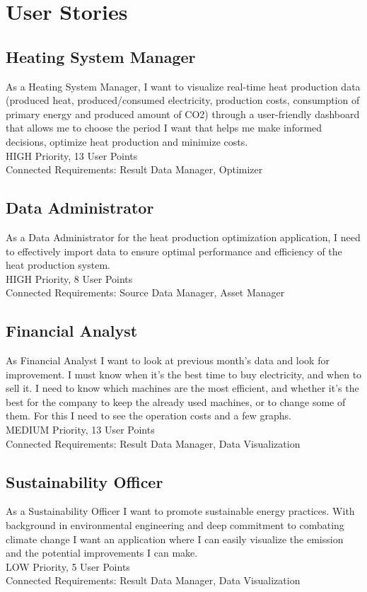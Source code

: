\documentclass[12pt]{report}
\begin{document}
\section*{User Stories}
\subsection*{Heating System Manager}
As a Heating System Manager, I want to visualize real-time heat production data (produced heat, produced/consumed electricity, production costs, consumption of primary energy and produced amount of CO2) through a user-friendly dashboard that allows me to choose the period I want that helps me make informed decisions, optimize heat production and minimize costs. \\
HIGH Priority, 13 User Points\\
Connected Requirements: Result Data Manager, Optimizer
\subsection*{Data Administrator}
As a Data Administrator for the heat production optimization application, I need to effectively import data to ensure optimal performance and efficiency of the heat production system. \\
HIGH Priority, 8 User Points\\
Connected Requirements: Source Data Manager, Asset Manager
\subsection*{Financial Analyst}
As Financial Analyst I want to look at previous month's data and look for improvement. I must know when it's the best time to buy electricity, and when to sell it. I need to know which machines are the most efficient, and whether it's the best for the company to keep the already used machines, or to change some of them. For this I need to see the operation costs and a few graphs. \\
MEDIUM Priority, 13 User Points\\
Connected Requirements: Result Data Manager, Data Visualization
\subsection*{Sustainability Officer}
As a Sustainability Officer I want to promote sustainable energy practices. With background in environmental engineering and deep commitment to combating climate change I want an application where I can easily visualize the emission and the potential improvements I can make.\\
LOW Priority, 5 User Points\\
Connected Requirements: Result Data Manager, Data Visualization
\clearpage
\end{document}
